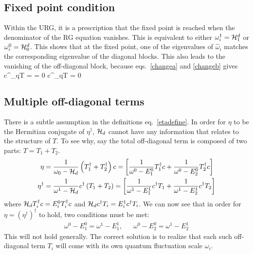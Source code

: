 \documentclass[12pt,twoside]{report}
\numberwithin{equation}{section}
\begin{document}
\subsection{Fixed point condition}\label{match}
Within the URG, it is a prescription that the fixed point is reached when the denominator of the RG equation vanishes. This is equivalent to either \(\omega_i^1 = \mathcal{H}^d_1 \) or \(\omega_i^0 = \mathcal{H}^d_0 \).
This shows that at the fixed point, one of the eigenvalues of \(\hat \omega_i\) matches the corresponding eigenvalue of the diagonal blocks. This also leads to the vanishing of the off-diagonal block, because eqs.~\ref{changea} and \ref{changeb} gives
\beq
c^\dagger_{q\beta}T =  = 0 \implies c^\dagger_{q\beta}T = 0
\eeq
\subsection{Multiple off-diagonal terms}
There is a subtle assumption in the definitions eq.~\ref{etadefine}. In order for \(\eta\) to be the Hermitian conjugate of \(\eta^\dagger\), \(\mathcal{H}_d\) cannot have any information that relates to the structure of \(T\). To see why, say the total off-diagonal term is composed of two parts: \(T = T_1 + T_2\).
\begin{equation}\begin{aligned}
	\eta &= \frac{1}{\omega_0 - \mathcal{H}_d}\left(T_1^\dagger + T_2^\dagger\right)c = \left[\frac{1}{\omega^0 - E^0_1} T_1^\dagger c+ \frac{1}{\omega^0 - E^0_2}T_2^\dagger c\right]\\
	\eta^\dagger &= \frac{1}{\omega^1 - \mathcal{H}_d}c^\dagger\left(T_1 + T_2\right) = \left[\frac{1}{\omega^1 - E^1_1}c^\dagger T_1 + \frac{1}{\omega^1 - E^1_2} c^\dagger T_2\right]\\
\end{aligned}\end{equation}
where \(\mathcal{H}_d T_i^\dagger c = E^0_i T_i^\dagger c\) and \(\mathcal{H}_d  c^\dagger T_i = E^1_i  c^\dagger T_i\). We can now see that in order for \(\eta = \left(\eta^\dagger\right)^\dagger\) to hold, two conditions must be met:
\begin{equation}\begin{aligned}
	\omega^0 - E_1^0 = \omega^1 - E_1^1, && \omega^0 - E_2^0 = \omega^1 - E_2^1
\end{aligned}\end{equation}
This will not hold generally. The correct solution is to realize that each such off-diagonal term \(T_i\) will come with its own quantum fluctuation scale \(\omega_i\).
\end{document}
